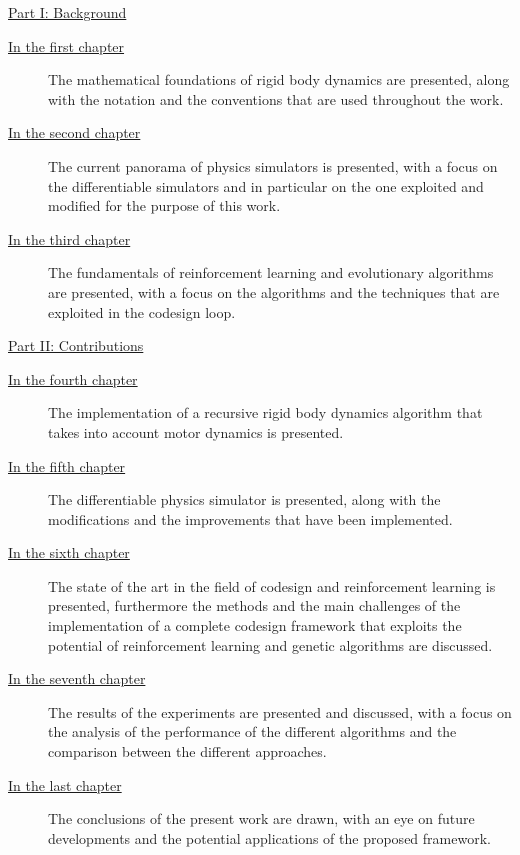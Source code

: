 \begin{description}

    \item{\hyperref[part:background]{Part I: Background}}

          \begin{description}
              \item[{\hyperref[chp:back_RBDynamics]{In the first chapter}}] The mathematical foundations of rigid body dynamics are presented, along with the notation and the conventions that are used throughout the work.
              \item[{\hyperref[chp:back_PhysicsSimulators]{In the second chapter}}] The current panorama of physics simulators is presented, with a focus on the differentiable simulators and in particular on the one exploited and modified for the purpose of this work.
              \item [{\hyperref[chp:back_RLGA]{In the third chapter}}] The fundamentals of reinforcement learning and evolutionary algorithms are presented, with a focus on the algorithms and the techniques that are exploited in the codesign loop.
          \end{description}

    \item{\hyperref[part:contributions]{Part II: Contributions}}

          \begin{description}
              \item[{\hyperref[chp:contrib_ABA]{In the fourth chapter}}] The implementation of a recursive rigid body dynamics algorithm that takes into account motor dynamics is presented.
              \item[{\hyperref[chp:contrib_JaxSim]{In the fifth chapter}}] The differentiable physics simulator is presented, along with the modifications and the improvements that have been implemented.
              \item[{\hyperref[chp:contrib_CodesignRL]{In the sixth chapter}}] The state of the art in the field of codesign and reinforcement learning is presented, furthermore the methods and the main challenges of the implementation of a complete codesign framework that exploits the potential of reinforcement learning and genetic algorithms are discussed.
              \item[{\hyperref[chp:contrib_ResultsDiscussion]{In the seventh chapter}}] The results of the experiments are presented and discussed, with a focus on the analysis of the performance of the different algorithms and the comparison between the different approaches.
              \item[{\hyperref[chp:contrib_Conclusions]{In the last chapter}}] The conclusions of the present work are drawn, with an eye on future developments and the potential applications of the proposed framework.
          \end{description}
\end{description}